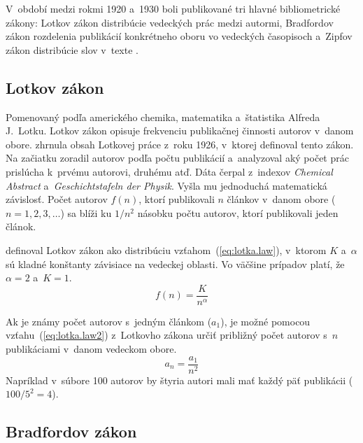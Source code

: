 V~období medzi rokmi 1920 a~1930 boli publikované tri hlavné bibliometrické
zákony: Lotkov zákon distribúcie vedeckých prác medzi autormi, Bradfordov zákon
rozdelenia publikácií konkrétneho oboru vo vedeckých časopisoch a~Zipfov
zákon distribúcie
slov v~texte \citep{Bellis2009}.


\subsection{Lotkov zákon}

Pomenovaný podľa amerického chemika, matematika a~štatistika Alfreda J.~Lotku.
Lotkov zákon opisuje frekvenciu publikačnej činnosti autorov v~danom obore.
\citet{Ondrisova2011} zhrnula obsah Lotkovej práce z~roku 1926, v~ktorej
definoval tento zákon.  Na začiatku zoradil autorov podľa počtu publikácií
a~analyzoval aký počet prác prislúcha k~prvému autorovi, druhému atď.  Dáta čerpal
z~indexov \emph{Chemical Abstract} a~\emph{Geschichtstafeln der Physik}.  Vyšla
mu jednoduchá matematická závislosť.  Počet autorov $f(n)$, ktorí publikovali
$n$ článkov v~danom obore ($n = 1, 2, 3, \dots$) sa blíži ku $1/n^2$ násobku
počtu autorov, ktorí publikovali jeden článok.

\citet{Egghe2005} definoval Lotkov zákon ako distribúciu
vzťahom~(\ref{eq:lotka.law}), v~ktorom $K$ a~$\alpha$ sú kladné konštanty
závisiace na vedeckej oblasti.  Vo väčšine prípadov platí, že $\alpha = 2$
a~$K = 1$.
\begin{equation}
\label{eq:lotka.law}
f(n) = \frac{K}{n^\alpha}
\end{equation}

Ak je známy počet autorov s~jedným článkom ($a_1$), je možné pomocou
vzťahu~(\ref{eq:lotka.law2}) z~Lotkovho zákona určiť približný počet autorov
s~$n$ publikáciami v~danom vedeckom obore.
\begin{equation}
\label{eq:lotka.law2}
a_n = \frac{a_1}{n^2}
\end{equation}
Napríklad v~súbore 100 autorov by štyria autori mali mať každý päť publikácii
($100/5^2 = 4$).


\subsection{Bradfordov zákon}

